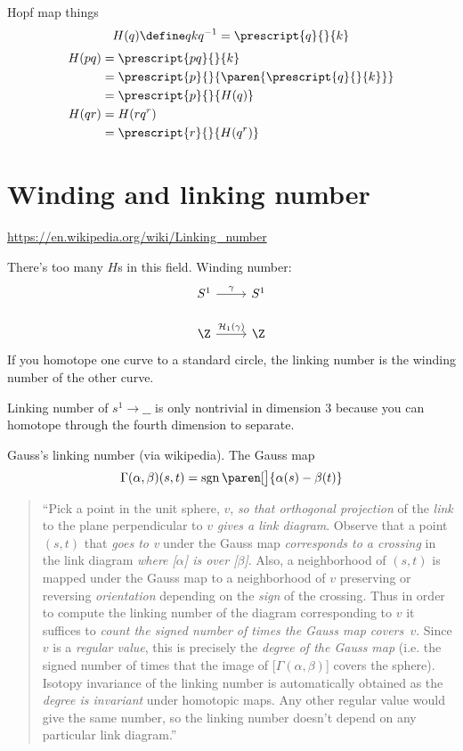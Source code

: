\documentclass{scrartcl}
\renewcommand{\blank}{\_\_}
\DeclareMathOperator{\sgn}{sgn}
\newcommand{\upleft}[2]{\prescript{#1}{}{#2}}
\begin{document}
\begin{multicols*}{2}
  Hopf map things
  \[
    H(q)\define qkq^{-1} = \upleft{q}{k}
  \]
  \begin{align*}
    H(pq) &= \upleft{pq}{k} \\
          &= \upleft{p}{\paren{\upleft{ q}k }} \\
          &=\upleft{p}{H(q)} \\
    H(qr) &= H(rq^r) \\
          &= \upleft{r}{H(q^r)}
  \end{align*}

  \section{Winding and linking number}
  \renewcommand{\H}{\mathcal H}
  \url{https://en.wikipedia.org/wiki/Linking_number}

  There's too many \(H\)s in this field.
  Winding number:
  \[
    \begin{tikzcd}
      S^1 \rar{\gamma} & S^1 \\
      \Z \rar{\H_1(\gamma)} & \Z
    \end{tikzcd}
  \]
  If you homotope one curve to a standard circle, the linking number is the winding number of the other curve.

  Linking number of \(s^1\to \blank\) is only nontrivial in dimension 3 because you can homotope through the fourth dimension to separate. %

  Gauss's linking number (via wikipedia). The Gauss map
  \[
    \Gamma(\alpha,\beta)(s,t) = \sgn\paren[\big]{\alpha(s) -\beta(t)}
  \]
  \begin{quote}
    \footnotesize
    ``Pick a point in the unit sphere, \(v\), \emph{so that orthogonal projection} of the \emph{link} to the plane perpendicular to \(v\) \emph{gives a link diagram}. Observe that a point \((s, t)\) that \emph{goes to v} under the Gauss map \emph{corresponds to a crossing} in the link diagram \emph{where [\(\alpha\)] is over [\(\beta\)]}.  Also, a neighborhood of \((s, t)\) is mapped under the Gauss map to a neighborhood of \(v\) preserving or reversing \emph{orientation} depending on the \emph{sign} of the crossing. Thus in order to compute the linking number of the diagram corresponding to \(v\) it suffices to \emph{count the signed number of times the Gauss map covers\eulit{}~\(v\)}. Since \(v\) is a \emph{regular value}, this is precisely the \emph{degree of the Gauss map} (i.e. the signed number of times that the image of [\(Γ(\alpha,\beta)\)] covers the sphere). Isotopy invariance of the linking number is automatically obtained as the \emph{degree is invariant} under homotopic maps. Any other regular value would give the same number, so the linking number doesn't depend on any particular link diagram.''
  \end{quote}


\end{multicols*}
\end{document}

